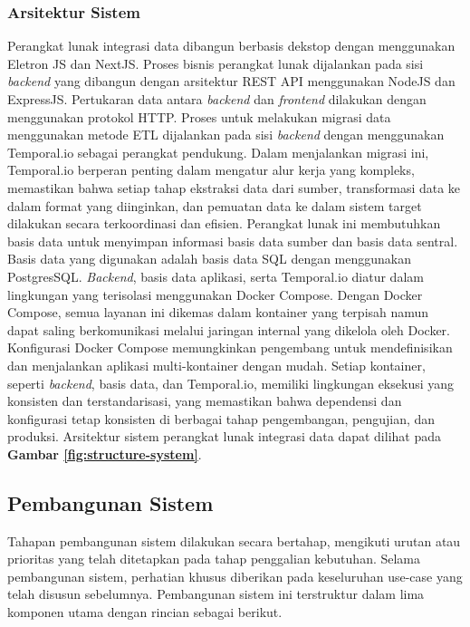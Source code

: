 \subsubsection{Arsitektur Sistem}
Perangkat lunak integrasi data dibangun berbasis dekstop dengan menggunakan Eletron JS dan NextJS. Proses bisnis perangkat lunak dijalankan pada sisi \emph{backend} yang dibangun dengan arsitektur REST API menggunakan NodeJS dan ExpressJS. Pertukaran data antara \emph{backend} dan \emph{frontend} dilakukan dengan menggunakan protokol HTTP. Proses untuk melakukan migrasi data menggunakan metode ETL dijalankan pada sisi \emph{backend} dengan menggunakan Temporal.io sebagai perangkat pendukung. Dalam menjalankan migrasi ini, Temporal.io berperan penting dalam mengatur alur kerja yang kompleks, memastikan bahwa setiap tahap ekstraksi data dari sumber, transformasi data ke dalam format yang diinginkan, dan pemuatan data ke dalam sistem target dilakukan secara terkoordinasi dan efisien. Perangkat lunak ini membutuhkan basis data untuk menyimpan informasi basis data sumber dan basis data sentral. Basis data yang digunakan adalah basis data SQL dengan menggunakan PostgresSQL. \emph{Backend}, basis data aplikasi, serta Temporal.io diatur dalam lingkungan yang terisolasi menggunakan Docker Compose. Dengan Docker Compose, semua layanan ini dikemas dalam kontainer yang terpisah namun dapat saling berkomunikasi melalui jaringan internal yang dikelola oleh Docker. Konfigurasi Docker Compose memungkinkan pengembang untuk mendefinisikan dan menjalankan aplikasi multi-kontainer dengan mudah. Setiap kontainer, seperti \emph{backend}, basis data, dan Temporal.io, memiliki lingkungan eksekusi yang konsisten dan terstandarisasi, yang memastikan bahwa dependensi dan konfigurasi tetap konsisten di berbagai tahap pengembangan, pengujian, dan produksi. Arsitektur sistem perangkat lunak integrasi data dapat dilihat pada \textbf{Gambar \ref{fig:structure-system}}.

\subsection{Pembangunan Sistem}
Tahapan pembangunan sistem dilakukan secara bertahap, mengikuti urutan atau prioritas yang telah ditetapkan pada tahap penggalian kebutuhan. Selama pembangunan sistem, perhatian khusus diberikan pada keseluruhan use-case yang telah disusun sebelumnya. Pembangunan sistem ini terstruktur dalam lima komponen utama dengan rincian sebagai berikut.
